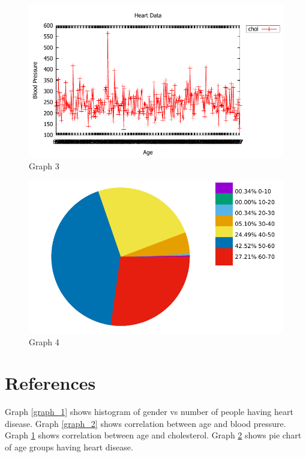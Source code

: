 \documentclass{article}
\begin{document}
\begin{figure}[h]
\includegraphics[width=\textwidth]{./q4c.pdf}
\caption{\label{graph_3} Graph 3}
\end{figure}

\begin{figure}[h]
\includegraphics[width=\textwidth]{./q4d.pdf}
\caption{\label{graph_4} Graph 4}
\end{figure}

\section{References}
Graph \ref{graph_1} shows histogram of gender vs number of people having heart disease. Graph \ref{graph_2} shows correlation between age and blood pressure. Graph \ref{graph_3} shows correlation between age and cholesterol. Graph \ref{graph_4} shows pie chart of age groups having heart disease.
\end{document}
